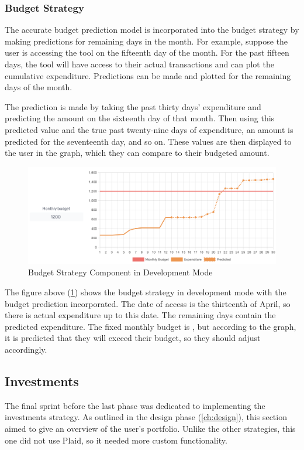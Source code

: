 \subsubsection{Budget Strategy}
The accurate budget prediction model is incorporated into the budget strategy by making predictions for remaining days in the month. For example, suppose the user is accessing the tool on the fifteenth day of the month. For the past fifteen days, the tool will have access to their actual transactions and can plot the cumulative expenditure. Predictions can be made and plotted for the remaining days of the month.

The prediction is made by taking the past thirty days' expenditure and predicting the amount on the sixteenth day of that month. Then using this predicted value and the true past twenty-nine days of expenditure, an amount is predicted for the seventeenth day, and so on. These values are then displayed to the user in the graph, which they can compare to their budgeted amount.

\begin{figure}[H]
	\centering
	\includegraphics[width=\textwidth]{images/budget_strategy.png}
	\caption{Budget Strategy Component in Development Mode}
	\label{fig:BudgetStrategy}
\end{figure}

The figure above (\ref{fig:BudgetStrategy}) shows the budget strategy in development mode with the budget prediction incorporated. The date of access is the thirteenth of April, so there is actual expenditure up to this date. The remaining days contain the predicted expenditure. The fixed monthly budget is , but according to the graph, it is predicted that they will exceed their budget, so they should adjust accordingly.

\subsection{Investments}
The final sprint before the last phase was dedicated to implementing the investments strategy. As outlined in the design phase (\ref{ch:design}), this section aimed to give an overview of the user's portfolio. Unlike the other strategies, this one did not use Plaid, so it needed more custom functionality.

